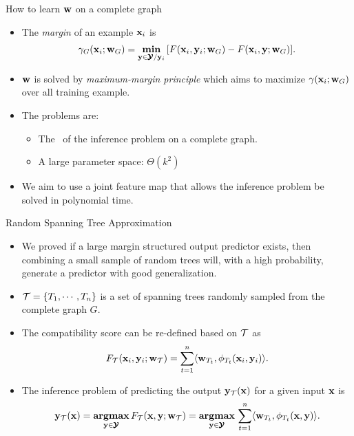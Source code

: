\documentclass[first=dgreen,second=purple,logo=yellowexc]{aaltoslides}
\begin{document}
%
\begin{frame}{How to learn $\mathbf {w}$ on a complete graph}
	\begin{itemize}
		\item The \textit{margin} of an example $\mathbf {x}_i$ is
		\begin{align*}
			\gamma_G(\mathbf {x}_i;\mathbf {w}_G) = \underset{\mathbf {y}\in\pmb {\mathcal{Y}}/\mathbf {y}_i}{\textbf{min}}\,[F(\mathbf {x}_i,\mathbf {y}_i;\mathbf {w}_G)-F(\mathbf {x}_i,\mathbf {y};\mathbf {w}_G)].
		\end{align*}
		\item $\mathbf {w}$ is solved by \textit{maximum-margin principle} which aims to maximize $\gamma(\mathbf {x}_i;\mathbf {w}_G)$ over all training example.
		\item The problems are:
		\begin{itemize}
			\item The \nphardness\ of the inference problem on a complete graph.
			\item A large parameter space: $\Theta(k^2)$
		\end{itemize}
		\item We aim to use a joint feature map that allows the inference problem be solved in polynomial time.
	\end{itemize}
\end{frame}



%
\begin{frame}{Random Spanning Tree Approximation}
	\begin{itemize}
		\item We proved if a large margin structured output predictor exists, then combining a small sample of random trees will, with a high probability, generate a predictor with good generalization.
		\item $\mathcal{T}=\{T_1,\cdots,T_n\}$ is a set of spanning trees randomly sampled from the complete graph $G$.
		\item The compatibility score can be re-defined based on $\mathcal{T}$ as
		\begin{align*}
			F_{\mathcal{T}}(\mathbf {x}_i,\mathbf {y}_i;\mathbf {w}_{\mathcal{T}}) = \sum_{t=1}^{n}\langle \mathbf {w}_{T_t}, \phi_{T_t}(\mathbf {x}_i,\mathbf {y}_i) \rangle.
		\end{align*}
		\item The inference problem of predicting the output $\mathbf {y}_{\mathcal{T}}(\mathbf {x})$ for a given input $\mathbf {x}$ is 
		\begin{align*}
			\mathbf {y}_{\mathcal{T}}(\mathbf {x}) = \underset{\mathbf {y}\in\pmb {\mathcal{Y}}}{\textbf{argmax}}\,F_{\mathcal{T}}(\mathbf {x},\mathbf {y};\mathbf {w}_{\mathcal{T}})=\underset{\mathbf {y}\in\pmb {\mathcal{Y}}}{\textbf{argmax}}\,\sum_{t=1}^{n}\langle \mathbf {w}_{T_t}, \phi_{T_t}(\mathbf {x},\mathbf {y}) \rangle.
		\end{align*}
	\end{itemize}
\end{frame}
\end{document}
